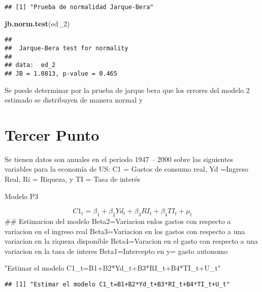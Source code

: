 \documentclass[
]{article}
\newenvironment{Shaded}{\begin{snugshade}}{\end{snugshade}}
\newcommand{\DecValTok}[1]{\textcolor[rgb]{0.00,0.00,0.81}{#1}}
\newcommand{\KeywordTok}[1]{\textcolor[rgb]{0.13,0.29,0.53}{\textbf{#1}}}
\newcommand{\NormalTok}[1]{#1}
\newcommand{\StringTok}[1]{\textcolor[rgb]{0.31,0.60,0.02}{#1}}
\begin{document}
\begin{verbatim}
## [1] "Prueba de normalidad Jarque-Bera"
\end{verbatim}

\begin{Shaded}
\begin{Highlighting}[]
\KeywordTok{jb.norm.test}\NormalTok{(ed_}\DecValTok{2}\NormalTok{)}
\end{Highlighting}
\end{Shaded}

\begin{verbatim}
## 
##  Jarque-Bera test for normality
## 
## data:  ed_2
## JB = 1.0813, p-value = 0.465
\end{verbatim}

Se puede determinar por la prueba de jarque bera que los errores del
modelo 2 estimado se distribuyen de manera normal y

\hypertarget{tercer-punto}{%
\section{Tercer Punto}\label{tercer-punto}}

Se tienen datos son anuales en el periodo 1947 -- 2000 sobre las
siguientes variables para la economía de US: C1 = Gastos de consumo
real, Yd =Ingreso Real, Ri = Riqueza, y TI = Tasa de interés

Modelo P3

\[C1_{t}=\beta_1+\beta_2Yd_{t}+\beta_3RI_{t}+\beta_4TI_{t}+\mu_t\] \#\#
Estimacion del modelo Beta2=Variacion enlos gastos con respecto a
variacion en el ingreso real Beta3=Variacion en los gastos con respecto
a una variacion en la riqueza disponible Beta4=Varacion en el gasto con
respecto a una variacion en la tasa de interes Beta1=Intercepto en y=
gasto autonomo

\begin{Shaded}
\begin{Highlighting}[]
\StringTok{"Estimar el modelo C1_t=B1+B2*Yd_t+B3*RI_t+B4*TI_t+U_t"}
\end{Highlighting}
\end{Shaded}

\begin{verbatim}
## [1] "Estimar el modelo C1_t=B1+B2*Yd_t+B3*RI_t+B4*TI_t+U_t"
\end{verbatim}
\end{document}
